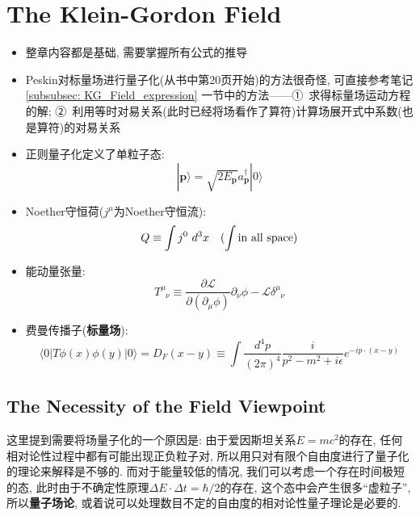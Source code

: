 \chapter{The Klein-Gordon Field}

\begin{itemize}
  \item 整章内容都是基础, 需要掌握所有公式的推导
  \item Peskin对标量场进行量子化(从书中第20页开始)的方法很奇怪, 可直接参考笔记 \ref{subsubsec: KG_Field_expression} 一节中的方法——①\ 求得标量场运动方程的解; ②\ 利用等时对易关系(此时已经将场看作了算符)计算场展开式中系数(也是算符)的对易关系
  \item 正则量子化定义了单粒子态:
        \begin{equation*}
          |\mathbf{p}\rangle = \sqrt{2E_{\mathbf{p}}}a^{\dagger}_{\mathbf{p}}|0\rangle
        \end{equation*}
  \item Noether守恒荷($j^\mu$为Noether守恒流):
        \begin{equation*}
          Q \equiv \int j^0\ d^3x \quad (\int {\rm in\ all\ space})
        \end{equation*}
  \item 能动量张量:
        \begin{equation*}
          T^{\mu}_{\phantom{\mu}\nu}\equiv \frac{\partial \mathcal{L}}{\partial (\partial_{\mu} \phi)} \partial_{\nu} \phi - \mathcal{L}\delta^{\mu}_{\phantom{\mu}\nu}
        \end{equation*}
  \item 费曼传播子(\textbf{标量场}):
        \begin{equation*}
          \langle 0|T\phi(x)\phi(y)|0 \rangle = D_F(x-y)\equiv \int \frac{d^4 p}{(2\pi)^4} \frac{i}{p^2 - m^2 +i\epsilon} e^{-ip\cdot (x-y)}
        \end{equation*}
\end{itemize}
\pagestyle{general}

\section{The Necessity of the Field Viewpoint}

这里提到需要将场量子化的一个原因是: 由于爱因斯坦关系$E = mc^2$的存在, 任何相对论性过程中都有可能出现正负粒子对, 所以用只对有限个自由度进行了量子化的理论来解释是不够的.
而对于能量较低的情况, 我们可以考虑一个存在时间极短的态, 此时由于不确定性原理$\Delta E \cdot \Delta t = \hbar /2$的存在, 这个态中会产生很多“虚粒子”, 所以\textbf{量子场论}, 或着说可以处理数目不定的自由度的相对论性量子理论是必要的.


